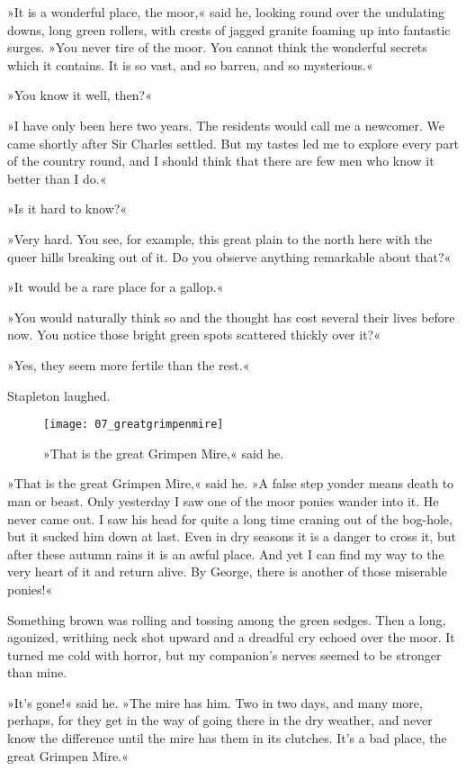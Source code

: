»It is a wonderful place, the moor,« said he, looking round over the undulating downs, long green rollers, with crests of jagged granite foaming up into fantastic surges. »You never tire of the moor. You cannot think the wonderful secrets which it contains. It is so vast, and so barren, and so mysterious.«

»You know it well, then?«

»I have only been here two years. The residents would call me a newcomer. We came shortly after Sir Charles settled. But my tastes led me to explore every part of the country round, and I should think that there are few men who know it better than I do.«

»Is it hard to know?«

»Very hard. You see, for example, this great plain to the north here with the queer hills breaking out of it. Do you observe anything remarkable about that?«

»It would be a rare place for a gallop.«

»You would naturally think so and the thought has cost several their lives before now. You notice those bright green spots scattered thickly over it?«

»Yes, they seem more fertile than the rest.«

Stapleton laughed.


\begin{figure}[tbhp]
\centering
\texttt{[image: 07\_greatgrimpenmire]}
\caption{»That is the great Grimpen Mire,« said he.}
\end{figure}

»That is the great Grimpen Mire,« said he. »A false step yonder means death to man or beast. Only yesterday I saw one of the moor ponies wander into it. He never came out. I saw his head for quite a long time craning out of the bog-hole, but it sucked him down at last. Even in dry seasons it is a danger to cross it, but after these autumn rains it is an awful place. And yet I can find my way to the very heart of it and return alive. By George, there is another of those miserable ponies!«

Something brown was rolling and tossing among the green sedges. Then a long, agonized, writhing neck shot upward and a dreadful cry echoed over the moor. It turned me cold with horror, but my companion's nerves seemed to be stronger than mine.

»It's gone!« said he. »The mire has him. Two in two days, and many more, perhaps, for they get in the way of going there in the dry weather, and never know the difference until the mire has them in its clutches. It's a bad place, the great Grimpen Mire.«

